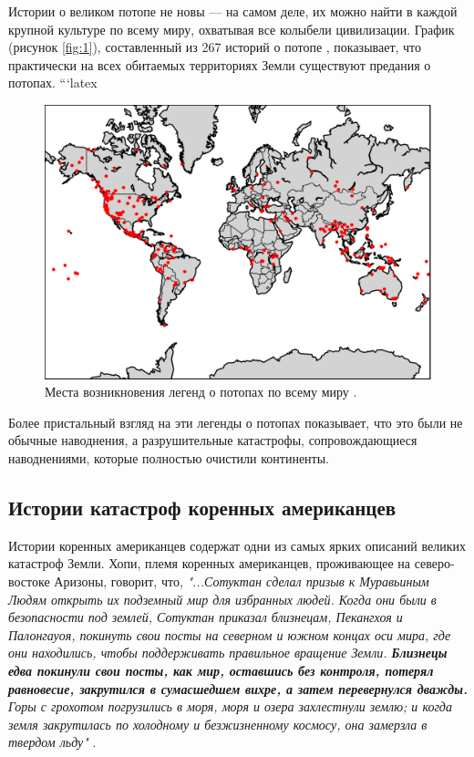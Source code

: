 \documentclass[10pt,twocolumn,letterpaper]{article}
\begin{document}
Истории о великом потопе не новы — на самом деле, их можно найти в каждой крупной культуре по всему миру, охватывая все колыбели цивилизации. График (рисунок \ref{fig:1}), составленный из 267 историй о потопе \cite{3}, показывает, что практически на всех обитаемых территориях Земли существуют предания о потопах.
```latex
\begin{figure}[h]
\begin{center}
   \includegraphics[width=1\linewidth]{b.png}
\end{center}
   \caption{Места возникновения легенд о потопах по всему миру \cite{3}.}
\label{fig:1}
\label{fig:onecol}
\end{figure}

Более пристальный взгляд на эти легенды о потопах показывает, что это были не обычные наводнения, а разрушительные катастрофы, сопровождающиеся наводнениями, которые полностью очистили континенты.

\subsection{Истории катастроф коренных американцев}

Истории коренных американцев содержат одни из самых ярких описаний великих катастроф Земли. Хопи, племя коренных американцев, проживающее на северо-востоке Аризоны, говорит, что, \textit{"...Сотуктан сделал призыв к Муравьиным Людям открыть их подземный мир для избранных людей. Когда они были в безопасности под землей, Сотуктан приказал близнецам, Пекангхоя и Палонгауоя, покинуть свои посты на северном и южном концах оси мира, где они находились, чтобы поддерживать правильное вращение Земли. \textbf{Близнецы едва покинули свои посты, как мир, оставшись без контроля, потерял равновесие, закрутился в сумасшедшем вихре, а затем перевернулся дважды.} Горы с грохотом погрузились в моря, моря и озера захлестнули землю; и когда земля закрутилась по холодному и безжизненному космосу, она замерзла в твердом льду"} \cite{4}.
\end{document}
